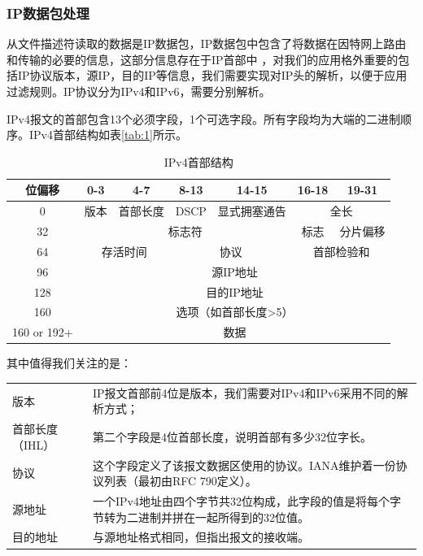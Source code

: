 \documentclass[format=final, language=chinese, degree=fyp]{hustthesis}
\begin{document}
\subsubsection{IP数据包处理}


从文件描述符读取的数据是IP数据包，IP数据包中包含了将数据在因特网上路由和传输的必要的信息，这部分信息存在于IP首部中
，对我们的应用格外重要的包括IP协议版本，源IP，目的IP等信息，我们需要实现对IP头的解析，以便于应用过滤规则。IP协议分为IPv4和IPv6，需要分别解析。

IPv4报文的首部包含13个必须字段，1个可选字段。所有字段均为大端的二进制顺序。IPv4首部结构如表\autoref{tab:1}所示。

\begin{table}[h!]
\centering
\caption{IPv4首部结构}\label{tab:1}
\begin{tabular}{|c|c|c|c|c|c|c|}
	\hline
	位偏移 & 0-3 & 4-7 & 8-13 & 14-15 & 16-18 & 19-31\\
	\hline
	0 & 版本 & 首部长度 & DSCP & 显式拥塞通告 & \multicolumn{2}{c|}{全长}\\
	\hline
	32 & \multicolumn{4}{c|}{标志符} & 标志 & 分片偏移 \\
	\hline
	64 & \multicolumn{2}{c|}{存活时间}& \multicolumn{2}{c|}{协议}& \multicolumn{2}{c|}{首部检验和} \\
	\hline
	96 & \multicolumn{6}{c|}{源IP地址} \\
	\hline
	128 & \multicolumn{6}{c|}{目的IP地址} \\
	\hline
	160 & \multicolumn{6}{c|}{选项（如首部长度>5）} \\
	\hline
	160 or 192+ & \multicolumn{6}{c|}{数据}\\
	\hline
\end{tabular}
\end{table}


其中值得我们关注的是：
\begin{table}[h!]
\begin{tabular}{l l}
	版本 & IP报文首部前4位是版本，我们需要对IPv4和IPv6采用不同的解析方式；\\
	首部长度（IHL） & 第二个字段是4位首部长度，说明首部有多少32位字长。\\
	协议 & 这个字段定义了该报文数据区使用的协议。IANA维护着一份协议列表（最初由RFC 790定义）。\\
	源地址 & 一个IPv4地址由四个字节共32位构成，此字段的值是将每个字节转为二进制并拼在一起所得到的32位值。\\
	目的地址 & 与源地址格式相同，但指出报文的接收端。
\end{tabular}
\end{table}
\end{document}
